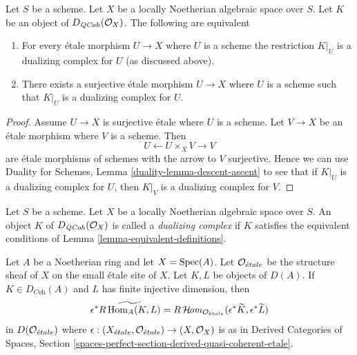\begin{lemma}
\label{lemma-equivalent-definitions}
Let $S$ be a scheme. Let $X$ be a locally Noetherian algebraic space over $S$.
Let $K$ be an object of $D_{\mathit{QCoh}}(\mathcal{O}_X)$. The following are equivalent
\begin{enumerate}
\item For every \'etale morphism $U \to X$ where $U$ is a scheme
the restriction $K|_U$ is a dualizing complex for $U$ (as discussed above).
\item There exists a surjective \'etale morphism $U \to X$ where $U$ is a
scheme such that $K|_U$ is a dualizing complex for $U$.
\end{enumerate}
\end{lemma}

\begin{proof}
Assume $U \to X$ is surjective \'etale where $U$ is a scheme.
Let $V \to X$ be an \'etale morphism where $V$ is a scheme.
Then
$$
U \leftarrow U \times_X V \rightarrow V
$$
are \'etale morphisms of schemes with the arrow to $V$ surjective.
Hence we can use Duality for Schemes, Lemma \ref{duality-lemma-descent-ascent}
to see that if $K|_U$ is a dualizing complex for $U$, then
$K|_V$ is a dualizing complex for $V$.
\end{proof}

\begin{definition}
\label{definition-dualizing-scheme}
Let $S$ be a scheme.
Let $X$ be a locally Noetherian algebraic space over $S$.
An object $K$ of $D_{\mathit{QCoh}}(\mathcal{O}_X)$ is called a
{\it dualizing complex} if $K$ satisfies the equivalent conditions of
Lemma \ref{lemma-equivalent-definitions}.
\end{definition}

\begin{lemma}
\label{lemma-affine-duality}
Let $A$ be a Noetherian ring and let $X = \mathop{\mathrm{Spec}}(A)$. Let
$\mathcal{O}_{\acute{e}tale}$ be the structure sheaf of $X$ on the
small \'etale site of $X$. Let $K, L$ be objects of $D(A)$.
If $K \in D_{\textit{Coh}}(A)$ and $L$ has finite injective
dimension, then
$$
\epsilon^*\widetilde{R\mathop{\mathrm{Hom}}\nolimits_A(K, L)} =
R\mathop{\mathcal{H}\!\mathit{om}}\nolimits_{\mathcal{O}_{\acute{e}tale}}(\epsilon^*\widetilde{K},
\epsilon^*\widetilde{L})
$$
in $D(\mathcal{O}_{\acute{e}tale})$ where
$\epsilon : (X_{\acute{e}tale}, \mathcal{O}_{\acute{e}tale}) \to (X, \mathcal{O}_X)$
is as in Derived Categories of Spaces, Section
\ref{spaces-perfect-section-derived-quasi-coherent-etale}.
\end{lemma}

